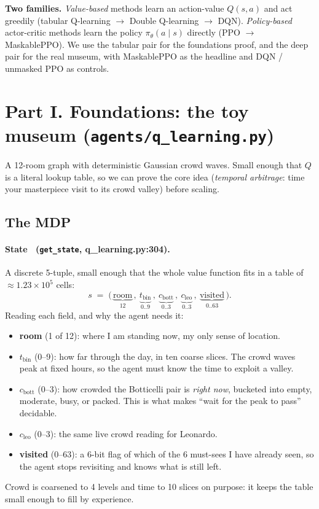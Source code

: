 \documentclass[11pt]{article}
\newcommand{\file}[1]{\texttt{\small #1}}
\begin{document}
\noindent
\textbf{Two families.} \emph{Value-based} methods learn an action-value $Q(s,a)$ and act
greedily (tabular Q-learning $\to$ Double Q-learning $\to$ DQN). \emph{Policy-based}
actor-critic methods learn the policy $\pi_\theta(a\mid s)$ directly (PPO $\to$
MaskablePPO). We use the tabular pair for the foundations proof, and the deep pair for
the real museum, with MaskablePPO as the headline and DQN / unmasked PPO as controls.

\section{Part I. Foundations: the toy museum (\file{agents/q\_learning.py})}

A 12-room graph with deterministic Gaussian crowd waves. Small enough that $Q$ is a
literal lookup table, so we can prove the core idea (\emph{temporal arbitrage}: time
your masterpiece visit to its crowd valley) before scaling.

\subsection{The MDP}

\paragraph{State \ (\file{get\_state}, q\_learning.py:304).} A discrete 5-tuple, small
enough that the whole value function fits in a table of $\approx 1.23\times10^5$ cells:
\[
s \;=\; \big(\, \underbrace{\text{room}}_{12}\,,\ \underbrace{t_{\text{bin}}}_{0..9}\,,\ \underbrace{c_{\text{bott}}}_{0..3}\,,\ \underbrace{c_{\text{leo}}}_{0..3}\,,\ \underbrace{\text{visited}}_{0..63}\,\big).
\]
Reading each field, and why the agent needs it:
\begin{itemize}
\item \textbf{room} (1 of 12): where I am standing now, my only sense of location.
\item \textbf{$t_{\text{bin}}$} (0--9): how far through the day, in ten coarse slices. The crowd waves peak at fixed hours, so the agent must know the time to exploit a valley.
\item \textbf{$c_{\text{bott}}$} (0--3): how crowded the Botticelli pair is \emph{right now}, bucketed into empty, moderate, busy, or packed. This is what makes ``wait for the peak to pass'' decidable.
\item \textbf{$c_{\text{leo}}$} (0--3): the same live crowd reading for Leonardo.
\item \textbf{visited} (0--63): a 6-bit flag of which of the 6 must-sees I have already seen, so the agent stops revisiting and knows what is still left.
\end{itemize}
Crowd is coarsened to 4 levels and time to 10 slices on purpose: it keeps the table
small enough to fill by experience.
\end{document}
